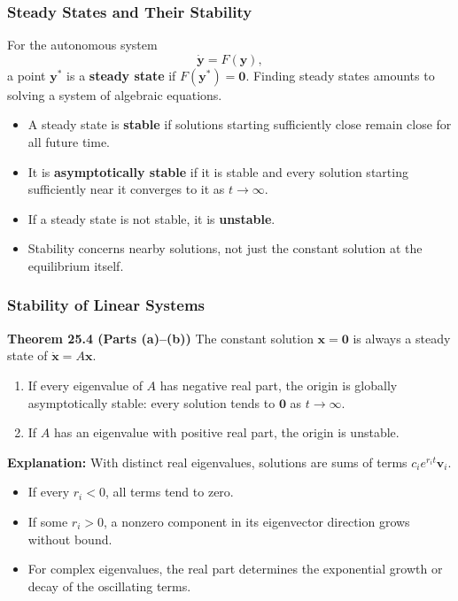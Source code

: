 \documentclass[9pt,aspectratio=169]{beamer}
\begin{document}
\begin{frame}
    \frametitle{Steady States and Their Stability}
    For the autonomous system
    \[
        \dot{\mathbf{y}}=F(\mathbf{y}),
    \]
    a point $\mathbf{y}^*$ is a \textbf{steady state} if
    $F(\mathbf{y}^*)=\mathbf{0}$. Finding steady states amounts to
    solving a system of algebraic equations.
    \begin{itemize}
        \item A steady state is \textbf{stable} if solutions starting
        sufficiently close remain close for all future time.
        \item It is \textbf{asymptotically stable} if it is stable and
        every solution starting sufficiently near it converges to it
        as $t\rightarrow\infty$.
        \item If a steady state is not stable, it is \textbf{unstable}.
        \item Stability concerns nearby solutions, not just the constant
        solution at the equilibrium itself.
    \end{itemize}
\end{frame}

\begin{frame}
    \frametitle{Stability of Linear Systems}
    \begin{block}{\textbf{Theorem 25.4 (Parts (a)--(b))}}
        The constant solution $\mathbf{x}=\mathbf{0}$ is always a
        steady state of $\dot{\mathbf{x}}=A\mathbf{x}$.
        \begin{enumerate}
            \item[(a)] If every eigenvalue of $A$ has negative real
            part, the origin is globally asymptotically stable:
            every solution tends to $\mathbf{0}$ as $t\rightarrow\infty$.
            \item[(b)] If $A$ has an eigenvalue with positive real part,
            the origin is unstable.
        \end{enumerate}
    \end{block}
    \textbf{Explanation:} With distinct real eigenvalues, solutions
    are sums of terms $c_ie^{r_it}\mathbf{v}_i$.
    \begin{itemize}
        \item If every $r_i<0$, all terms tend to zero.
        \item If some $r_i>0$, a nonzero component in its eigenvector
        direction grows without bound.
        \item For complex eigenvalues, the real part determines the
        exponential growth or decay of the oscillating terms.
    \end{itemize}
\end{frame}
\end{document}
